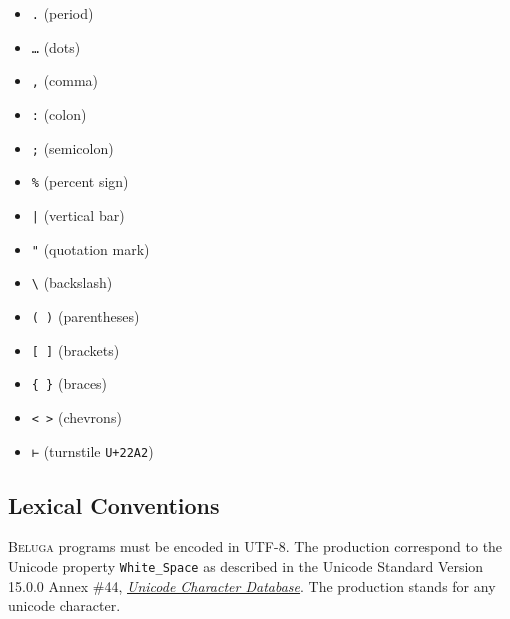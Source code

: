 \documentclass[11pt]{article}
\newcommand{\Beluga}{\textsc{Beluga}\xspace}
\begin{document}
{\setlength{\columnseprule}{0.4pt}
\begin{multicols}{3}
\begin{itemize}[label={}]
\item \texttt{.} \hfill (period)
\item \texttt{…} \hfill (dots)
\item \texttt{,} \hfill (comma)
\item \texttt{:} \hfill (colon)
\item \texttt{;} \hfill (semicolon)
\item \texttt{\%} \hfill (percent sign)
\item \texttt{|} \hfill (vertical bar)
\item \texttt{"} \hfill (quotation mark)
\item \texttt{\textbackslash} \hfill (backslash)
\item \texttt{( )} \hfill (parentheses)
\item \texttt{[ ]} \hfill (brackets)
\item \texttt{\{ \}} \hfill (braces)
\item \texttt{< >} \hfill (chevrons)
\item \texttt{⊢} \hfill (turnstile \texttt{U+22A2})
\end{itemize}
\end{multicols}
}

\subsection{Lexical Conventions}

\Beluga programs must be encoded in \textsc{UTF-8}.
The production  correspond to the Unicode property \texttt{White\_Space} as described in the Unicode Standard Version 15.0.0 Annex \#44, \href{https://www.unicode.org/reports/tr44/tr44-30.html#White_Space}{\textit{Unicode Character Database}}.
The production  stands for any unicode character.
\end{document}
